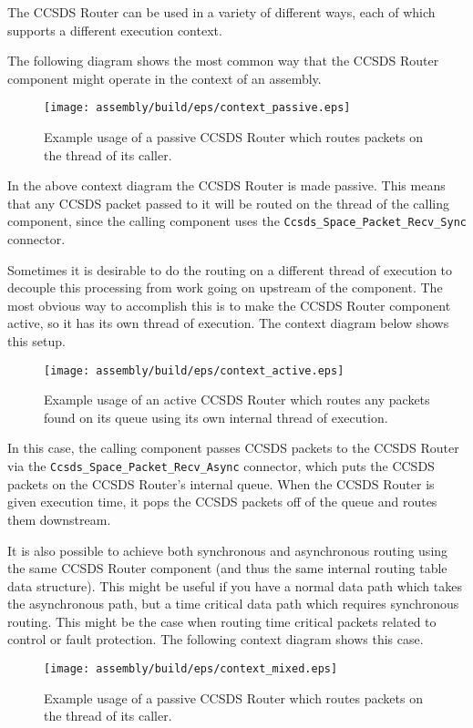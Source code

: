 The CCSDS Router can be used in a variety of different ways, each of which supports a different execution context.

The following diagram shows the most common way that the CCSDS Router component might operate in the context of an assembly.

\begin{figure}[H]
  \texttt{[image: assembly/build/eps/context\_passive.eps]}
  \caption{Example usage of a passive CCSDS Router which routes packets on the thread of its caller.}
\end{figure}

In the above context diagram the CCSDS Router is made passive. This means that any CCSDS packet passed to it will be routed on the thread of the calling component, since the calling component uses the \texttt{Ccsds\_Space\_Packet\_Recv\_Sync} connector.

Sometimes it is desirable to do the routing on a different thread of execution to decouple this processing from work going on upstream of the component. The most obvious way to accomplish this is to make the CCSDS Router component active, so it has its own thread of execution. The context diagram below shows this setup.

\begin{figure}[H]
  \texttt{[image: assembly/build/eps/context\_active.eps]}
  \caption{Example usage of an active CCSDS Router which routes any packets found on its queue using its own internal thread of execution.}
\end{figure}

In this case, the calling component passes CCSDS packets to the CCSDS Router via the \texttt{Ccsds\_Space\_Packet\_Recv\_Async} connector, which puts the CCSDS packets on the CCSDS Router's internal queue. When the CCSDS Router is given execution time, it pops the CCSDS packets off of the queue and routes them downstream.

It is also possible to achieve both synchronous and asynchronous routing using the same CCSDS Router component (and thus the same internal routing table data structure). This might be useful if you have a normal data path which takes the asynchronous path, but a time critical data path which requires synchronous routing. This might be the case when routing time critical packets related to control or fault protection. The following context diagram shows this case.

\begin{figure}[H]
  \texttt{[image: assembly/build/eps/context\_mixed.eps]}
  \caption{Example usage of a passive CCSDS Router which routes packets on the thread of its caller.}
\end{figure}

